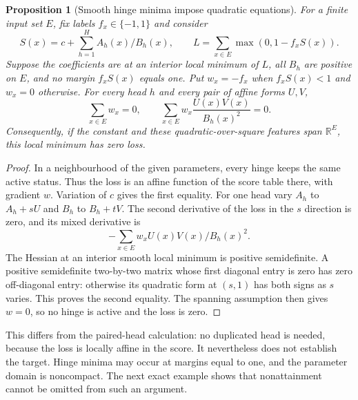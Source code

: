 \documentclass[11pt]{article}
\newtheorem{proposition}{Proposition}
\begin{document}
\begin{proposition}[Smooth hinge minima impose quadratic equations]
For a finite input set $E$, fix labels $f_x\in\{-1,1\}$ and consider
\[
 S(x)=c+\sum_{h=1}^H A_h(x)/B_h(x),\qquad
 L=\sum_{x\in E}\max(0,1-f_xS(x)).
\]
Suppose the coefficients are at an interior local minimum of $L$, all
$B_h$ are positive on $E$, and no margin $f_xS(x)$ equals one.
Put $w_x=-f_x$ when $f_xS(x)<1$ and $w_x=0$ otherwise.
For every head $h$ and every pair of affine forms $U,V$,
\[
 \sum_{x\in E}w_x=0,\qquad
 \sum_{x\in E} w_x\frac{U(x)V(x)}{B_h(x)^2}=0.
\]
Consequently, if the constant and these quadratic-over-square features
span $\mathbb R^E$, this local minimum has zero loss.
\end{proposition}
\begin{proof}
In a neighbourhood of the given parameters, every hinge keeps the same
active status. Thus the loss is an affine function of the score table
there, with gradient $w$. Variation of $c$ gives the first equality.
For one head vary $A_h$ to $A_h+sU$ and $B_h$ to $B_h+tV$.
The second derivative of the loss in the $s$ direction is zero, and
its mixed derivative is
\[
 -\sum_{x\in E}w_x U(x)V(x)/B_h(x)^2.
\]
The Hessian at an interior smooth local minimum is positive semidefinite.
A positive semidefinite two-by-two matrix whose first diagonal entry
is zero has zero off-diagonal entry: otherwise its quadratic form
at $(s,1)$ has both signs as $s$ varies. This proves the second
equality. The spanning assumption then gives $w=0$, so no hinge is
active and the loss is zero.
\end{proof}

This differs from the paired-head calculation: no duplicated head is
needed, because the loss is locally affine in the score. It nevertheless
does not establish the target. Hinge minima may occur at margins equal
to one, and the parameter domain is noncompact. The next exact example
shows that nonattainment cannot be omitted from such an argument.
\end{document}
